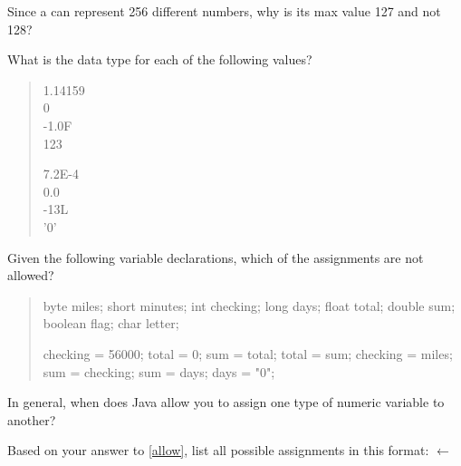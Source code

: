 \Q Since a  can represent 256 different numbers, why is its max value 127 and not 128?

\begin{answer}
\end{answer}


\Q What is the data type for each of the following values?

\begin{quote}
\begin{multicols}{2}
1.14159  \\[1ex]
0        \\[1ex]
-1.0F    \\[1ex]
123     

7.2E-4   \\[1ex]
0.0      \\[1ex]
-13L     \\[1ex]
'0'     
\end{multicols}
\end{quote}


\Q Given the following variable declarations, which of the assignments are not allowed?

\begin{quote}
\begin{multicols}{2}

\begin{javalst}
byte miles;
short minutes;
int checking;
long days;
float total;
double sum;
boolean flag;
char letter;
\end{javalst}

\begin{javalst}
checking = 56000;
total = 0;
sum = total;
total = sum;
checking = miles;
sum = checking;
sum = days;
days = "0";
\end{javalst}

\end{multicols}
\end{quote}


\Q \label{allow} In general, when does Java allow you to assign one type of numeric variable to another?

\begin{answer}
\end{answer}


\Q Based on your answer to \ref{allow}, list all possible assignments in this format:
 $\gets$ 

\begin{answer}
\end{answer}
